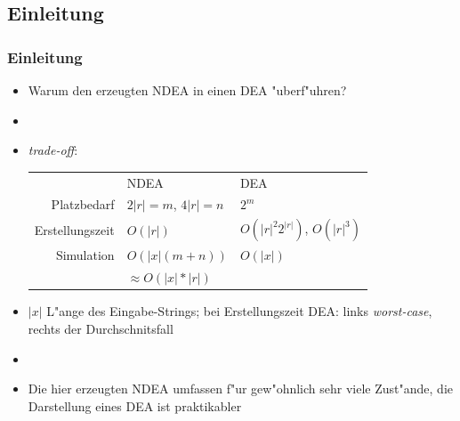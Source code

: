\documentclass[ignorenonframetext]{beamer}
\begin{document}
\subsection*{Einleitung}
\begin{frame}
    \frametitle{Einleitung}

    \begin{itemize}
        \item[] Warum den erzeugten NDEA in einen DEA "uberf"uhren?
        \item[]
        \item[] \textit{trade-off}:
        \begin{tabular}{rll}
                             & NDEA & DEA\\
            Platzbedarf      & $2|r| = m$, $4|r| = n$ & $2^{m}$\\
            Erstellungszeit  & $O(|r|)$  & $O(|r|^2 2^{|r|})$, $O(|r|^3)$\\
            Simulation       & $O(|x|(m+n))$                    & $O(|x|)$ \\
                             & $\approx O(|x|*|r|)$ & \\
        \end{tabular}
        \item[]\footnotesize $|x|$ L"ange des Eingabe-Strings; bei Erstellungszeit DEA: links \textit{worst-case}, rechts der Durchschnitsfall\normalsize
        \item[]
        \item Die hier erzeugten NDEA umfassen f"ur gew"ohnlich sehr viele Zust"ande, die Darstellung eines DEA ist praktikabler
    \end{itemize}

\end{frame}
\end{document}
